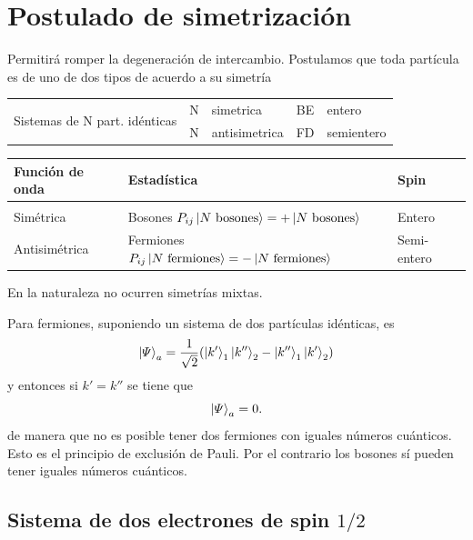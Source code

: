 \documentclass[10pt,oneside]{CBFT_book}
\begin{document}
\section{Postulado de simetrización}

Permitirá romper la degeneración de intercambio. 
Postulamos que toda partícula es de uno de dos tipos de acuerdo a su simetría 

\begin{center}
\begin{tabular}{|c|l|l|l|l|}
\multirow{2}{*}{Sistemas de N part. idénticas} & N & simetrica & BE & entero\\
& N & antisimetrica & FD & semientero
\end{tabular}
\end{center}

\begin{center}
\begin{tabular}{lll}
Función de onda & Estadística & Spin \\
\hline \\
Simétrica & Bosones $P_{ij}\Ket{ N \text{ bosones}} = 
+ \Ket{ N \text{ bosones}} $ & Entero\\
Antisimétrica & Fermiones $P_{ij}\Ket{ N \text{ fermiones}} = 
- \Ket{ N \text{ fermiones}} $ & Semi-entero
\end{tabular}
\end{center}

En la naturaleza no ocurren simetrías mixtas.


Para fermiones, suponiendo un sistema de dos partículas idénticas, es
\[
	\Ket{ \Psi }_a = \frac{1}{\sqrt{2}}( \Ket{k'}_1\Ket{k''}_2 - \Ket{k''}_1\Ket{k'}_2)
\]
y entonces si $k'=k''$ se tiene que 
\[
	\Ket{ \Psi }_a = 0.
\]
de manera que no es posible tener dos fermiones con iguales números cuánticos.
Esto es el principio de exclusión de Pauli. 
Por el contrario los bosones sí pueden tener iguales números cuánticos.



\subsection{Sistema de dos electrones de spin $1/2$}
\end{document}
